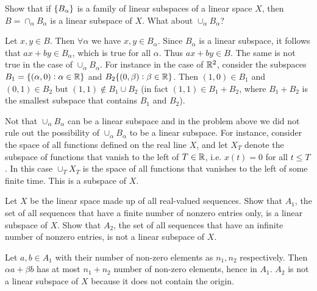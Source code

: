\begin{problem}
	\label{prob:intersectionOfSubspaces}
	Show that if $ \{B_\alpha\} $ is a family of linear subspaces of a linear space $ X $, then $ B = \cap_\alpha B_\alpha $ is a linear subspace of $ X $. What about $ \cup_\alpha B_\alpha $?
\end{problem}

\begin{solution}
	Let $ x,y \in B $. Then $ \forall \alpha $ we have $ x,y\in B_\alpha $. Since $ B_\alpha $ is a linear subspace, it follows that $ ax + by \in B_\alpha $, which is true for all $ \alpha $. Thus $ ax+by \in B $. The same is not true in the case of $ \cup_\alpha B_\alpha $. For instance in the case of $ \mathbb{R}^2 $, consider the subspaces $ B_1 = \{(\alpha,0):\alpha\in\mathbb{R}\} $ and $ B_2\{(0,\beta):\beta\in\mathbb{R}\} $. Then $ (1,0)\in B_1 $ and $ (0,1)\in B_2 $ but $ (1,1) \notin B_1\cup B_2 $ (in fact $ (1,1) \in B_1+B_2 $, where $ B_1+B_2 $ is the smallest subspace that contains $ B_1 $ and $ B_2 $).
\end{solution}
\begin{remark}
	Not that $ \cup_\alpha B_\alpha $ can be a linear subspace and in the problem above we did not rule out the possibility of $ \cup_\alpha B_\alpha $ to be a linear subspace. For instance, consider the space of all functions defined on the real line $ X $, and let $ X_T $ denote the subspace of functions that vanish to the left of $ T\in\mathbb{R} $, i.e. $ x(t) = 0 $ for all $ t\leq T $. In this case $ \cup_T X_T $ is the space of all functions that vanishes to the left of some finite time. This is a subspace of $ X $.
\end{remark}


\begin{problem}
	Let $ X $ be the linear space made up of all real-valued sequences. Show that $ A_1 $, the set of all sequences that have a finite number of nonzero entries only, is a linear subspace of $ X $. Show that $ A_2 $, the set of all sequences that have an infinite number of nonzero entries, is not a linear subspace of $ X $.
\end{problem}

\begin{solution}
	Let $ a,b\in A_1 $ with their number of non-zero elements as $ n_1,n_2 $ respectively. Then $ \alpha a+ \beta b $ has at most $ n_1+n_2 $ number of non-zero elements, hence in $ A_1 $. $ A_2 $ is not a linear subspace of $ X $ because it does not contain the origin.
\end{solution}



